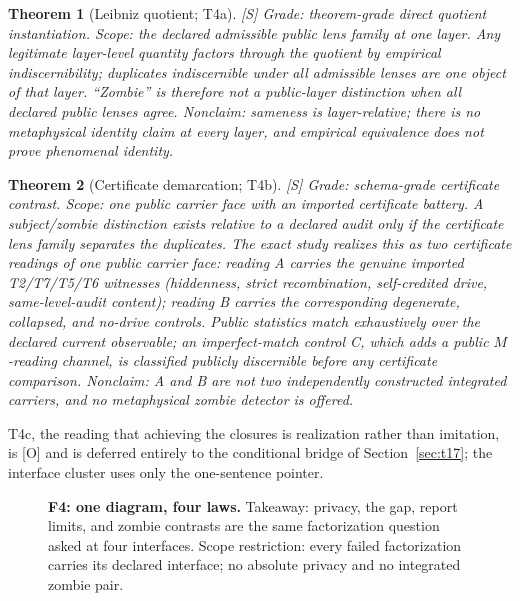 \documentclass[11pt]{article}
\newcommand{\gradeS}{\textsf{[S]}}
\newcommand{\gradeO}{\textsf{[O]}}
\newtheorem{theorem}{Theorem}[section]
\theoremstyle{definition}
\begin{document}
\begin{theorem}[Leibniz quotient; T4a]
\gradeS{} \emph{Grade:} theorem-grade direct quotient instantiation.
\emph{Scope:} the declared admissible public lens family at one layer. Any
legitimate layer-level quantity factors through the quotient by empirical
indiscernibility; duplicates indiscernible under \emph{all} admissible lenses
are one object of that layer. ``Zombie'' is therefore not a public-layer
distinction when all declared public lenses agree. \emph{Nonclaim:} sameness
is layer-relative; there is no metaphysical identity claim at every layer, and
empirical equivalence does not prove phenomenal identity.
\end{theorem}

\begin{theorem}[Certificate demarcation; T4b]
\gradeS{} \emph{Grade:} schema-grade certificate contrast. \emph{Scope:} one
public carrier face with an imported certificate battery. A subject/zombie
distinction exists relative to a declared audit only if the certificate lens
family separates the duplicates. The exact study realizes this as two
\emph{certificate readings of one} public carrier face: reading A carries the
genuine imported T2/T7/T5/T6 witnesses (hiddenness, strict recombination,
self-credited drive, same-level-audit content); reading B carries the
corresponding degenerate, collapsed, and no-drive controls. Public statistics
match exhaustively over the declared current observable; an imperfect-match
control C, which adds a public $M$-reading channel, is classified publicly
discernible \emph{before} any certificate comparison. \emph{Nonclaim:} A and
B are not two independently constructed integrated carriers, and no
metaphysical zombie detector is offered.
\end{theorem}

T4c, the reading that achieving the closures is realization rather than
imitation, is \gradeO{} and is deferred entirely to the conditional bridge
of Section~\ref{sec:t17}; the interface cluster uses only the one-sentence
pointer.

\begin{figure}[t]
\centering
{}
\caption{\textbf{F4: one diagram, four laws.} Takeaway: privacy, the gap,
report limits, and zombie contrasts are the same factorization question asked
at four interfaces. Scope restriction: every failed factorization carries its
declared interface; no absolute privacy and no integrated zombie pair.}
\label{fig:interface}
\end{figure}
\end{document}
